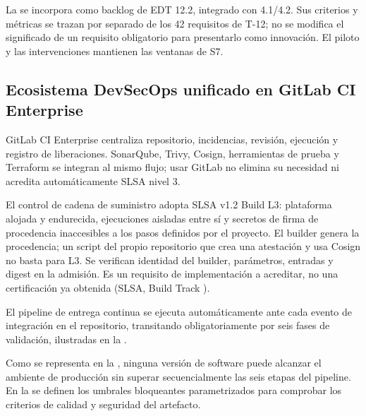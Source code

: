 La  se incorpora como backlog de EDT 12.2, integrado con 4.1/4.2. Sus criterios y métricas se trazan por separado de los 42 requisitos de T-12; no se modifica el significado de un requisito obligatorio para presentarlo como innovación. El piloto y las intervenciones mantienen las ventanas de S7.

\FloatBarrier
\subsection{Ecosistema DevSecOps unificado en GitLab CI Enterprise}\label{sec:6-desarrollo-devsecops}\label{sec:06-ecosistema-devsecops-unificado-en-gitlab-ci-enterprise}

GitLab CI Enterprise centraliza repositorio, incidencias, revisión, ejecución y registro de liberaciones. SonarQube, Trivy, Cosign, herramientas de prueba y Terraform se integran al mismo flujo; usar GitLab no elimina su necesidad ni acredita automáticamente SLSA nivel 3.


El control de cadena de suministro adopta SLSA v1.2 Build L3: plataforma alojada y endurecida, ejecuciones aisladas entre sí y secretos de firma de procedencia inaccesibles a los pasos definidos por el proyecto. El builder genera la procedencia; un script del propio repositorio que crea una atestación y usa Cosign no basta para L3. Se verifican identidad del builder, parámetros, entradas y digest en la admisión. Es un requisito de implementación a acreditar, no una certificación ya obtenida (SLSA, Build Track \parencite{d3_slsa12}).

El pipeline de entrega continua se ejecuta automáticamente ante cada evento de integración en el repositorio, transitando obligatoriamente por seis fases de validación, ilustradas en la .


Como se representa en la , ninguna versión de software puede alcanzar el ambiente de producción sin superar secuencialmente las seis etapas del pipeline. En la  se definen los umbrales bloqueantes parametrizados para comprobar los criterios de calidad y seguridad del artefacto.

